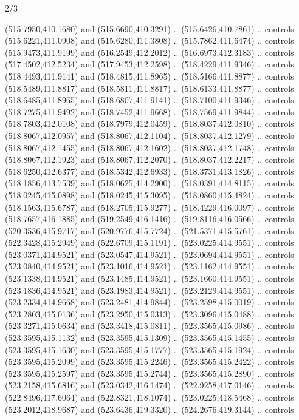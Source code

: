 \begin{flagdescription}{2/3}
\begin{scope}[xshift=0.5\flaglength,yshift=0.5\flagwidth,scale=\flagwidth/495.65]
\begin{scope}[y=0.8pt, x=0.8pt, yscale=-1,shift={(-463.76,-309.78)}]
  (515.7950,410.1680) and (515.6690,410.3291) .. (515.6426,410.7861) .. controls
  (515.6221,411.0908) and (515.6280,411.3808) .. (515.7862,411.6474) .. controls
  (515.9473,411.9199) and (516.2549,412.2012) .. (516.6973,412.3183) .. controls
  (517.4502,412.5234) and (517.9453,412.2598) .. (518.4229,411.9346) .. controls
  (518.4493,411.9141) and (518.4815,411.8965) .. (518.5166,411.8877) .. controls
  (518.5489,411.8817) and (518.5811,411.8817) .. (518.6133,411.8877) .. controls
  (518.6485,411.8965) and (518.6807,411.9141) .. (518.7100,411.9346) .. controls
  (518.7275,411.9492) and (518.7452,411.9668) .. (518.7569,411.9844) .. controls
  (518.7803,412.0108) and (518.7979,412.0459) .. (518.8037,412.0810) .. controls
  (518.8067,412.0957) and (518.8067,412.1104) .. (518.8037,412.1279) .. controls
  (518.8067,412.1455) and (518.8067,412.1602) .. (518.8037,412.1748) .. controls
  (518.8067,412.1923) and (518.8067,412.2070) .. (518.8037,412.2217) .. controls
  (518.6250,412.6377) and (518.5342,412.6933) .. (518.3731,413.1826) .. controls
  (518.1856,413.7539) and (518.0625,414.2900) .. (518.0391,414.8115) .. controls
  (518.0245,415.0898) and (518.0245,415.3095) .. (518.0860,415.4824) .. controls
  (518.1563,415.6787) and (518.2705,415.9277) .. (518.4229,416.0097) .. controls
  (518.7657,416.1885) and (519.2549,416.1416) .. (519.8116,416.0566) .. controls
  (520.3536,415.9717) and (520.9776,415.7724) .. (521.5371,415.5761) .. controls
  (522.3428,415.2949) and (522.6709,415.1191) .. (523.0225,414.9551) .. controls
  (523.0371,414.9521) and (523.0547,414.9521) .. (523.0694,414.9551) .. controls
  (523.0840,414.9521) and (523.1016,414.9521) .. (523.1162,414.9551) .. controls
  (523.1338,414.9521) and (523.1485,414.9521) .. (523.1660,414.9551) .. controls
  (523.1836,414.9521) and (523.1983,414.9521) .. (523.2129,414.9551) .. controls
  (523.2334,414.9668) and (523.2481,414.9844) .. (523.2598,415.0019) .. controls
  (523.2803,415.0136) and (523.2950,415.0313) .. (523.3096,415.0488) .. controls
  (523.3271,415.0634) and (523.3418,415.0811) .. (523.3565,415.0986) .. controls
  (523.3595,415.1132) and (523.3595,415.1309) .. (523.3565,415.1455) .. controls
  (523.3595,415.1630) and (523.3595,415.1777) .. (523.3565,415.1924) .. controls
  (523.3595,415.2099) and (523.3595,415.2246) .. (523.3565,415.2422) .. controls
  (523.3595,415.2597) and (523.3595,415.2744) .. (523.3565,415.2890) .. controls
  (523.2158,415.6816) and (523.0342,416.1474) .. (522.9258,417.0146) .. controls
  (522.8496,417.6064) and (522.8321,418.1074) .. (523.0225,418.5468) .. controls
  (523.2012,418.9687) and (523.6436,419.3320) .. (524.2676,419.3144) .. controls

\end{scope}
\end{scope}
\end{flagdescription}
